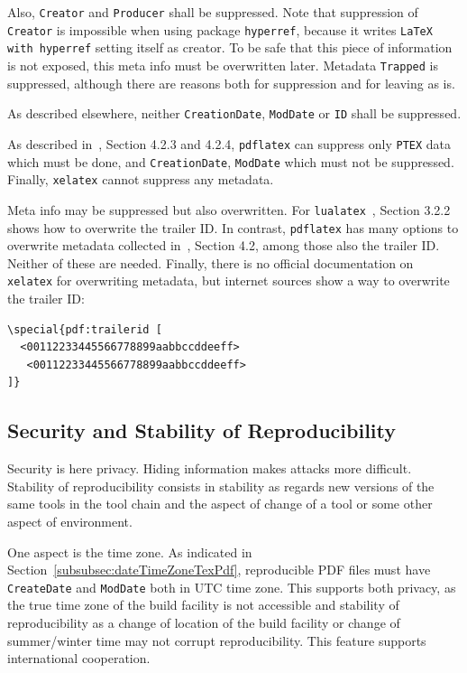 \documentclass[a4paper]{article}%
\newcommand{\pdflatex}{\texttt{pdflatex}}
\newcommand{\lualatex}{\texttt{lualatex}}
\newcommand{\xelatex}{\texttt{xelatex}}
\begin{document}
Also, \texttt{Creator} and \texttt{Producer} shall be suppressed. 
Note that suppression of \texttt{Creator} is impossible when using package \texttt{hyperref}, 
because it writes \texttt{LaTeX with hyperref} setting itself as creator. 
To be safe that this piece of information is not exposed, 
this meta info must be overwritten later. 
Metadata \texttt{Trapped} is suppressed, although there are reasons 
both for suppression and for leaving as is. 

As described elsewhere, neither \texttt{CreationDate}, \texttt{ModDate} or \texttt{ID} shall be suppressed. 

As described in~\cite{PdfTexUsr25}, Section 4.2.3 and 4.2.4, 
\pdflatex{} can suppress only \texttt{PTEX} data 
which must be done, and \texttt{CreationDate}, \texttt{ModDate} which must not be suppressed. 
Finally, \xelatex{} cannot suppress any metadata. 
\medskip 


Meta info may be suppressed but also overwritten. 
For \lualatex{}~\cite{LuaTexRef25}, Section 3.2.2 shows how to overwrite the trailer ID\@. 
In contrast, \pdflatex{} has many options to overwrite metadata 
collected in~\cite{PdfTexUsr25}, Section 4.2, among those also the trailer ID\@. 
Neither of these are needed. 
Finally, there is no official documentation on \xelatex{} for overwriting metadata, 
but internet sources show a way to overwrite the trailer ID\@: 
%
\begin{verbatim}
\special{pdf:trailerid [
  <00112233445566778899aabbccddeeff>
   <00112233445566778899aabbccddeeff>
]}
\end{verbatim}



\subsection{Security and Stability of Reproducibility}\label{subsec:securityRep}






Security is here privacy. 
Hiding information makes attacks more difficult. 
Stability of reproducibility consists in stability as regards new versions of the same tools 
in the tool chain and the aspect of change of a tool or some other aspect of environment. 

One aspect is the time zone. 
As indicated in Section~\ref{subsubsec:dateTimeZoneTexPdf}, 
reproducible PDF files must have \texttt{CreateDate} and \texttt{ModDate} 
both in UTC time zone. 
This supports both privacy, as the true time zone of the build facility is not accessible 
and stability of reproducibility as a change of location of the build facility 
or change of summer/winter time 
may not corrupt reproducibility. 
This feature supports international cooperation. 
\end{document}
